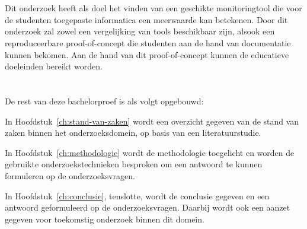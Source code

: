 \section{}
\label{sec:onderzoeksdoelstelling}

Dit onderzoek heeft als doel het vinden van een geschikte monitoringtool die voor de studenten toegepaste informatica een meerwaarde kan betekenen. Door dit onderzoek zal zowel een vergelijking van tools beschikbaar zijn, alsook een reproduceerbare proof-of-concept die studenten aan de hand van documentatie kunnen bekomen. Aan de hand van dit proof-of-concept kunnen de educatieve doeleinden bereikt worden.

\section{}
\label{sec:opzet-bachelorproef}

De rest van deze bachelorproef is als volgt opgebouwd:

In Hoofdstuk~\ref{ch:stand-van-zaken} wordt een overzicht gegeven van de stand van zaken binnen het onderzoeksdomein, op basis van een literatuurstudie.

In Hoofdstuk~\ref{ch:methodologie} wordt de methodologie toegelicht en worden de gebruikte onderzoekstechnieken besproken om een antwoord te kunnen formuleren op de onderzoeksvragen.

In Hoofdstuk~\ref{ch:conclusie}, tenslotte, wordt de conclusie gegeven en een antwoord geformuleerd op de onderzoeksvragen. Daarbij wordt ook een aanzet gegeven voor toekomstig onderzoek binnen dit domein.